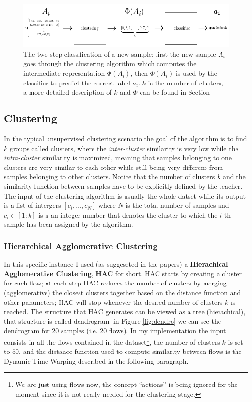 \begin{figure}[h]
 \centering
 \includegraphics{images/actual}
 \caption{\small{The two step classification of a new sample; first the new sample $A_i$ goes through the clustering algorithm which computes the intermediate representation $\Phi(A_i)$, then $\Phi(A_i)$ is used by the classifier to predict the correct label $a_i$. $k$ is the number of clusters, a more detailed description of $k$ and $\Phi$ can be found in Section }}
 \label{fig:actual}
\end{figure}

\subsection{Clustering}
In the typical unsupervised clustering scenario the goal of the algorithm is to find $k$ groups called clusters, where the \textit{inter-cluster} similarity is very low while the \textit{intra-cluster} similarity is maximized, meaning that samples belonging to one clusters are very similar to each other while still being very different from samples belonging to other clusters. Notice that the number of clusters $k$ and the similarity function between samples have to be explicitly defined by the teacher. The input of the clustering algorithm is usually the whole datset while its output is a list of intergers $[c_i,\dots, c_N]$ where $N$ is the total number of samples and $c_i \in [1;k]$ is a an integer number that denotes the cluster to which the $i$-th sample has been assigned by the algorithm.
\subsubsection{Hierarchical Agglomerative Clustering}
In this specific instance I used (as suggeseted in the papers) a \textbf{Hierachical Agglomerative Clustering}, \textbf{HAC} for short. HAC starts by creating a cluster for each flow; at each step HAC reduces the number of clusters by merging (agglomerative) the closest clusters together based on the distance function and other parameters; HAC will stop whenever the desired number of clusters $k$ is reached. The structure that HAC generates can be viewed as a tree (hierachical), that structure is called dendrogram; in Figure \ref{fig:dendro} we can see the dendrogram for 20 samples (i.e. 20 flows). In my implementation the input consists in all the flows contained in the dataset\footnote{We are just using flows now, the concept ``actions'' is being ignored for the moment since it is not really needed for the clustering stage.}, the number of clusters $k$ is set to $50$, and the distance function used to compute similarity between flows is the Dynamic Time Warping described in the following paragraph.

